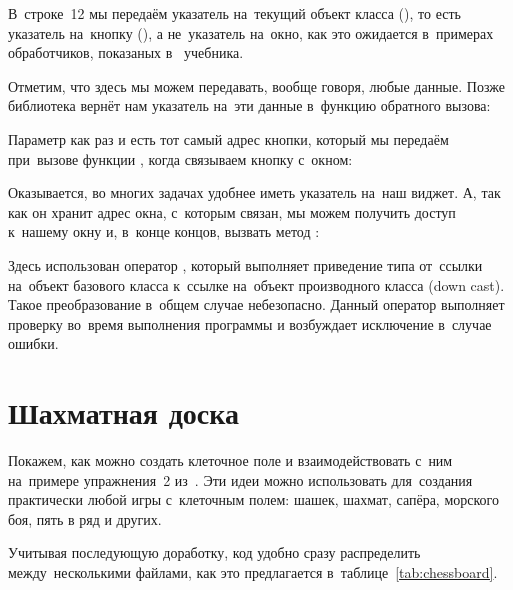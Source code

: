 
\noindent В~строке~12 мы передаём указатель на~текущий объект класса (), то есть указатель на~кнопку (), а не~указатель на~окно, как это ожидается в~примерах обработчиков, показаных в~ учебника.

Отметим, что здесь мы можем передавать, вообще говоря, любые данные. Позже библиотека  вернёт нам указатель на~эти данные в~функцию обратного вызова:


\noindent Параметр  как раз и есть тот самый адрес кнопки, который мы передаём при~вызове функции , когда связываем кнопку с~окном:


Оказывается, во многих задачах удобнее иметь указатель на~наш виджет. А, так как он хранит адрес окна, с~которым связан, мы можем получить доступ к~нашему окну и, в~конце концов, вызвать метод :


\noindent Здесь использован оператор , который выполняет приведение типа от~ссылки на~объект базового класса к~ссылке на~объект производного класса (\textenglish{down cast}). Такое преобразование в~общем случае небезопасно. Данный оператор выполняет проверку во~время выполнения программы и возбуждает исключение  в~случае ошибки.



\section{Шахматная доска}
Покажем, как можно создать клеточное поле и взаимодействовать с~ним на~примере упражнения~2 из~. Эти идеи можно использовать для~создания практически любой игры с~клеточным полем: шашек, шахмат, сапёра, морского боя, пять в ряд и других.

Учитывая последующую доработку, код удобно сразу распределить между~несколькими файлами, как это предлагается в~таблице~\ref{tab:chessboard}.


